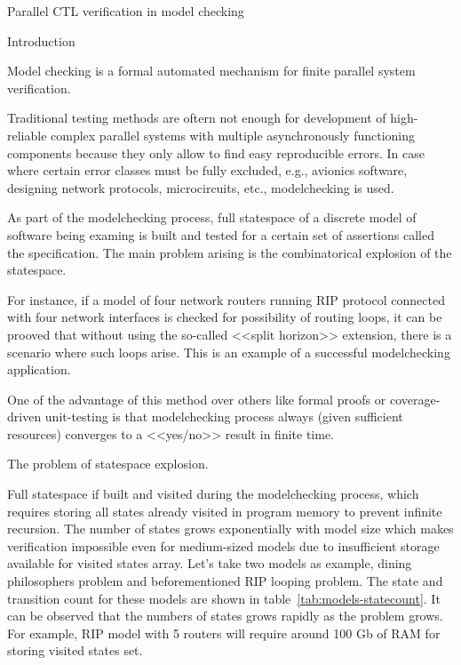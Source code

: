 Parallel CTL verification in model checking

Introduction

Model checking is a formal automated mechanism for finite parallel system verification.

Traditional testing methods are oftern not enough for development of high-reliable complex
parallel systems with multiple asynchronously functioning components because they only
allow to find easy reproducible errors. In case where certain error classes must be fully
excluded, e.g., avionics software, designing network protocols, microcircuits, etc.,
modelchecking is used.

As part of the modelchecking process, full statespace of a discrete model of software
being examing is built and tested for a certain set of assertions called the
specification. The main problem arising is the combinatorical explosion of the statespace.

For instance, if a model of four network routers running RIP protocol connected with four
network interfaces is checked for possibility of routing loops, it can be prooved that
without using the so-called <<split horizon>> extension, there is a scenario where such
loops arise. This is an example of a successful modelchecking application.

One of the advantage of this method over others like formal proofs or coverage-driven
unit-testing is that modelchecking process always (given sufficient resources) converges
to a <<yes/no>> result in finite time.

The problem of statespace explosion.

Full statespace if built and visited during the modelchecking process, which requires
storing all states already visited in program memory to prevent infinite recursion. The
number of states grows exponentially with model size which makes verification impossible
even for medium-sized models due to insufficient storage available for visited states
array. Let's take two models as example, dining philosophers problem and beforementioned
RIP looping problem. The state and transition count for these models are shown in
table~\ref{tab:models-statecount}. It can be observed that the numbers of states grows
rapidly as the problem grows. For example, RIP model with 5 routers will require around
100 Gb of RAM for storing visited states set.

